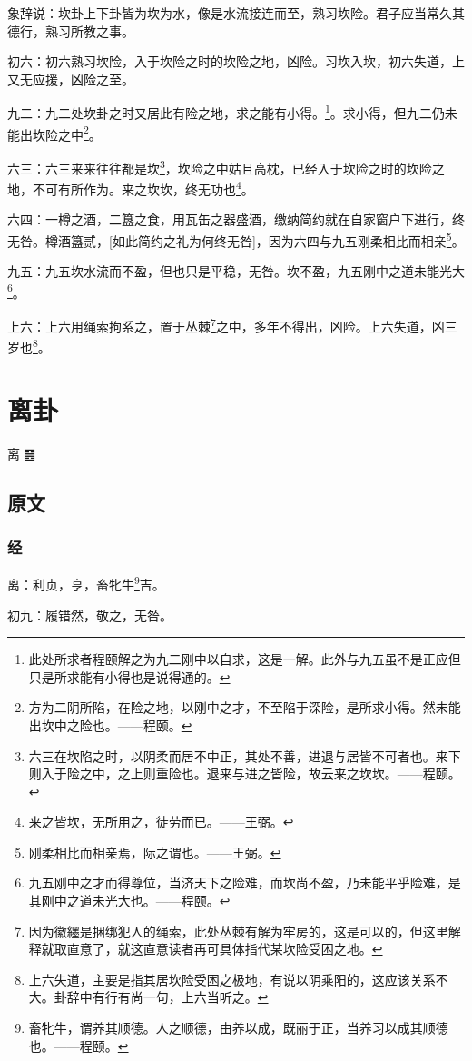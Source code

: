 \documentclass[12pt,oneside]{book}
\begin{document}
象辞说：坎卦上下卦皆为坎为水，像是水流接连而至，熟习坎险。君子应当常久其德行，熟习所教之事。

初六：初六熟习坎险，入于坎险之时的坎险之地，凶险。习坎入坎，初六失道，上又无应援，凶险之至。

九二：九二处坎卦之时又居此有险之地，求之能有小得。\footnote{此处所求者程颐解之为九二刚中以自求，这是一解。此外与九五虽不是正应但只是所求能有小得也是说得通的。}。求小得，但九二仍未能出坎险之中\footnote{方为二阴所陷，在险之地，以刚中之才，不至陷于深险，是所求小得。然未能出坎中之险也。——程颐。}。

六三：六三来来往往都是坎\footnote{六三在坎陷之时，以阴柔而居不中正，其处不善，进退与居皆不可者也。来下则入于险之中，之上则重险也。退来与进之皆险，故云来之坎坎。——程颐。}，坎险之中姑且高枕，已经入于坎险之时的坎险之地，不可有所作为。来之坎坎，终无功也\footnote{来之皆坎，无所用之，徒劳而已。——王弼。}。

六四：一樽之酒，二簋之食，用瓦缶之器盛酒，缴纳简约就在自家窗户下进行，终无咎。樽酒簋贰，[如此简约之礼为何终无咎]，因为六四与九五刚柔相比而相亲\footnote{刚柔相比而相亲焉，际之谓也。——王弼。}。

九五：九五坎水流而不盈，但也只是平稳，无咎。坎不盈，九五刚中之道未能光大\footnote{九五刚中之才而得尊位，当济天下之险难，而坎尚不盈，乃未能平乎险难，是其刚中之道未光大也。——程颐。}。

上六：上六用绳索拘系之，置于丛棘\footnote{因为徽纆是捆绑犯人的绳索，此处丛棘有解为牢房的，这是可以的，但这里解释就取直意了，就这直意读者再可具体指代某坎险受困之地。}之中，多年不得出，凶险。上六失道，凶三岁也\footnote{上六失道，主要是指其居坎险受困之极地，有说以阴乘阳的，这应该关系不大。卦辞中有行有尚一句，上六当听之。}。


\chapter{离卦}
离 {\Large ䷝}

\section{原文}


\subsection{经}
离：利贞，亨，畜牝牛\footnote{畜牝牛，谓养其顺德。人之顺德，由养以成，既丽于正，当养习以成其顺德也。——程颐。}吉。

初九：履错然，敬之，无咎。
\end{document}
